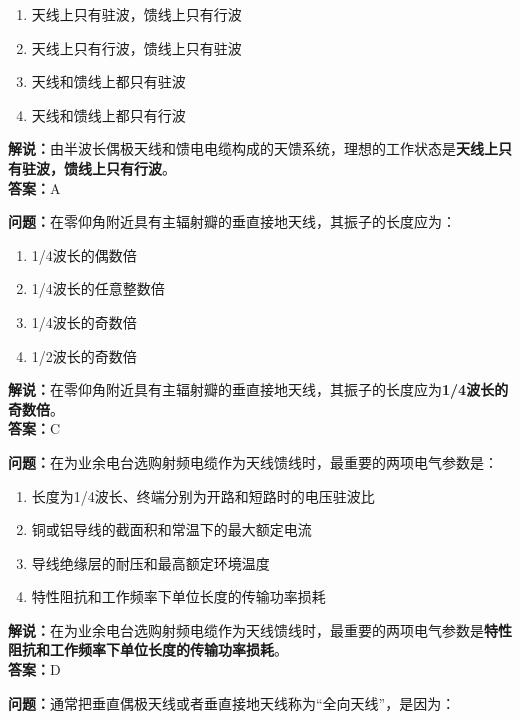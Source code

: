 \documentclass{ctexbook}
\begin{document}
\begin{enumerate}[label=\Alph*), leftmargin=3em]
	\item 天线上只有驻波，馈线上只有行波
	\item 天线上只有行波，馈线上只有驻波
	\item 天线和馈线上都只有驻波
	\item 天线和馈线上都只有行波
\end{enumerate}

\noindent\textbf{解说：}由半波长偶极天线和馈电电缆构成的天馈系统，理想的工作状态是\textbf{天线上只有驻波，馈线上只有行波}。\\\noindent\textbf{答案：}A%


\bigskip


\noindent\textbf{问题：}在零仰角附近具有主辐射瓣的垂直接地天线，其振子的长度应为：

\begin{enumerate}[label=\Alph*), leftmargin=3em]
	\item 1/4波长的偶数倍
	\item 1/4波长的任意整数倍
	\item 1/4波长的奇数倍
	\item 1/2波长的奇数倍
\end{enumerate}

\noindent\textbf{解说：}在零仰角附近具有主辐射瓣的垂直接地天线，其振子的长度应为\textbf{1/4波长的奇数倍}。\\\noindent\textbf{答案：}C%


\bigskip


\noindent\textbf{问题：}在为业余电台选购射频电缆作为天线馈线时，最重要的两项电气参数是：

\begin{enumerate}[label=\Alph*), leftmargin=3em]
	\item 长度为1/4波长、终端分别为开路和短路时的电压驻波比
	\item 铜或铝导线的截面积和常温下的最大额定电流
	\item 导线绝缘层的耐压和最高额定环境温度
	\item 特性阻抗和工作频率下单位长度的传输功率损耗
\end{enumerate}

\noindent\textbf{解说：}在为业余电台选购射频电缆作为天线馈线时，最重要的两项电气参数是\textbf{特性阻抗和工作频率下单位长度的传输功率损耗}。\\\noindent\textbf{答案：}D%


\bigskip


\noindent\textbf{问题：}通常把垂直偶极天线或者垂直接地天线称为“全向天线”，是因为：
\end{document}
